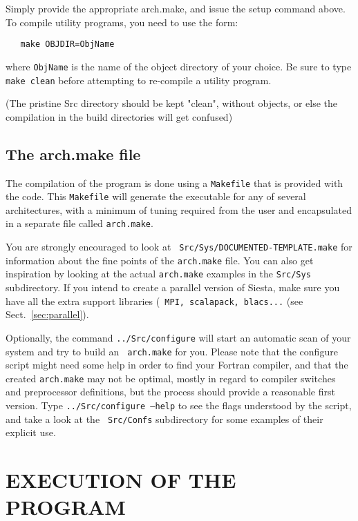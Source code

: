 \documentclass[11pt]{article}
\begin{document}
Simply provide the appropriate arch.make, and issue the setup command
above. To compile utility programs, you need to use the form:

\begin{verbatim}
   make OBJDIR=ObjName
\end{verbatim}

where {\tt ObjName} is the name of the object directory of your
choice. Be sure to type {\tt make clean} before attempting to
re-compile a utility program.

(The pristine Src directory should be kept "clean", without objects, or else
the compilation in the build directories will get confused)


\subsection{The arch.make file}
\label{sec:arch-make}

The compilation of the program is done using a {\tt Makefile} that is
provided with the code. This {\tt Makefile} will
generate the executable for any of several architectures, with a
minimum of tuning required from the user and encapsulated in a
separate file called {\tt arch.make}.

You are strongly encouraged to look at {\tt
  Src/Sys/DOCUMENTED-TEMPLATE.make} for information about the fine
points of the {\tt arch.make} file. You can also get inspiration by
looking at the actual {\tt arch.make} examples in the {\tt Src/Sys}
subdirectory. If you intend to create a parallel version of {\sc
  Siesta}, make sure you have all the extra support libraries ({\tt
  MPI, scalapack, blacs...} (see Sect.~\ref{sec:parallel}).

Optionally, the command {\tt ../Src/configure} will
start an automatic scan of your system and try to build an {\tt
  arch.make} for you. Please note that the configure script might need
some help in order to find your Fortran compiler, and that the created
{\tt arch.make} may not be optimal, mostly in regard to compiler
switches and preprocessor definitions, but the process should provide
a reasonable first version. Type {\tt ../Src/configure --help} to see
the flags understood by the script, and take a look at the {\tt
  Src/Confs} subdirectory for some examples of their explicit use.


\section{EXECUTION OF THE PROGRAM}
\end{document}
